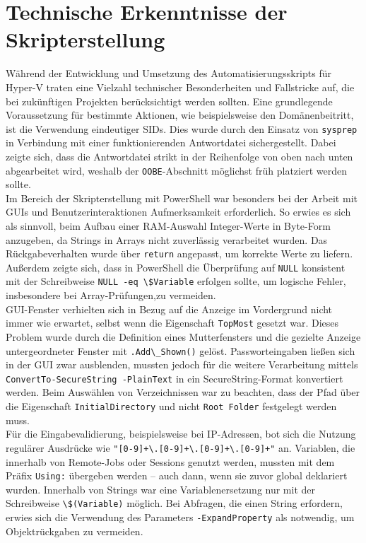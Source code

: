 \documentclass[a4paper,12pt]{article}
\begin{document}
\section{Technische Erkenntnisse der Skripterstellung}

Während der Entwicklung und Umsetzung des Automatisierungsskripts für Hyper-V traten eine Vielzahl technischer Besonderheiten und Fallstricke auf, die bei zukünftigen Projekten berücksichtigt werden sollten. Eine grundlegende Voraussetzung für bestimmte Aktionen, wie beispielsweise den Domänenbeitritt, ist die Verwendung eindeutiger SIDs. Dies wurde durch den Einsatz von \lstinline|sysprep| in Verbindung mit einer funktionierenden Antwortdatei sichergestellt. Dabei zeigte sich, dass die Antwortdatei strikt in der Reihenfolge von oben nach unten abgearbeitet wird, weshalb der \lstinline|OOBE|-Abschnitt möglichst früh platziert werden sollte.\\  


Im Bereich der Skripterstellung mit PowerShell war besonders bei der Arbeit mit GUIs und Benutzerinteraktionen Aufmerksamkeit erforderlich. So erwies es sich als sinnvoll, beim Aufbau einer RAM-Auswahl Integer-Werte in Byte-Form anzugeben, da Strings in Arrays nicht zuverlässig verarbeitet wurden. Das Rückgabeverhalten wurde über \lstinline|return| angepasst, um korrekte Werte zu liefern. Au\ss erdem zeigte sich, dass in PowerShell die Überprüfung auf \lstinline|NULL| konsistent mit der Schreibweise \lstinline|NULL -eq \$Variable| erfolgen sollte, um logische Fehler, insbesondere bei Array-Prüfungen,zu vermeiden. \\ 

GUI-Fenster verhielten sich in Bezug auf die Anzeige im Vordergrund nicht immer wie erwartet, selbst wenn die Eigenschaft \lstinline|TopMost| gesetzt war. Dieses Problem wurde durch die Definition eines Mutterfensters und die gezielte Anzeige untergeordneter Fenster mit \lstinline|.Add\_Shown()| gelöst. Passworteingaben lie\ss en sich in der GUI zwar ausblenden, mussten jedoch für die weitere Verarbeitung mittels \lstinline|ConvertTo-SecureString -PlainText| in ein SecureString-Format konvertiert werden. Beim Auswählen von Verzeichnissen war zu beachten, dass der Pfad über die Eigenschaft \lstinline|InitialDirectory| und nicht \lstinline|Root Folder| festgelegt werden muss.\\  

Für die Eingabevalidierung, beispielsweise bei IP-Adressen, bot sich die Nutzung regulärer Ausdrücke wie \lstinline|"[0-9]+\.[0-9]+\.[0-9]+\.[0-9]+"| an. Variablen, die innerhalb von Remote-Jobs oder Sessions genutzt werden, mussten mit dem Präfix \lstinline|Using:| übergeben werden -- auch dann, wenn sie zuvor global deklariert wurden. Innerhalb von Strings war eine Variablenersetzung nur mit der Schreibweise \lstinline|\$(Variable)| möglich. Bei Abfragen, die einen String erfordern, erwies sich die Verwendung des Parameters \lstinline|-ExpandProperty| als notwendig, um Objektrückgaben zu vermeiden.\\  
\end{document}
